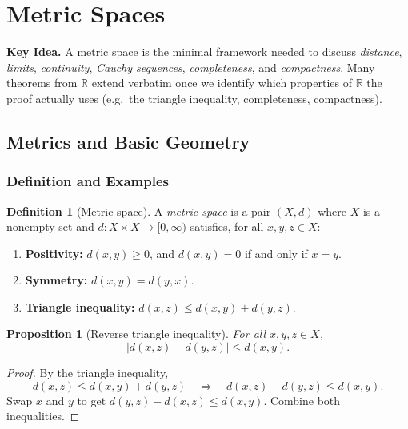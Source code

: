 \documentclass[12pt]{article}
\numberwithin{equation}{section}
\def\abs#1{|#1|}
\newcommand{\RR}{\mathbb{R}}
\DeclarePairedDelimiter{\abs}{\lvert}{\rvert}
\theoremstyle{plain}
\newtheorem{proposition}[theorem]{Proposition}
\theoremstyle{definition}
\newtheorem{definition}[theorem]{Definition}
\theoremstyle{remark}
\newenvironment{keyidea}{\begin{tcolorbox}\textbf{Key Idea.}}{\end{tcolorbox}}
\begin{document}
\newpage


\section{Metric Spaces}

\begin{keyidea}
A metric space is the minimal framework needed to discuss \emph{distance}, \emph{limits},
\emph{continuity}, \emph{Cauchy sequences}, \emph{completeness}, and \emph{compactness}.
Many theorems from $\RR$ extend verbatim once we identify which properties of $\RR$ the proof actually uses
(e.g.\ the triangle inequality, completeness, compactness).
\end{keyidea}

\subsection{Metrics and Basic Geometry}

\subsubsection{Definition and Examples}

\begin{definition}[Metric space]\label{ms:def:metric-space}
A \emph{metric space} is a pair $(X,d)$ where $X$ is a nonempty set and
$d:X\times X\to[0,\infty)$ satisfies, for all $x,y,z\in X$:
\begin{enumerate}[label=(\alph*)]
\item \textbf{Positivity:} $d(x,y)\ge 0$, and $d(x,y)=0$ if and only if $x=y$.
\item \textbf{Symmetry:} $d(x,y)=d(y,x)$.
\item \textbf{Triangle inequality:} $d(x,z)\le d(x,y)+d(y,z)$.
\end{enumerate}
\end{definition}

\begin{proposition}[Reverse triangle inequality]\label{ms:prop:reverse-triangle}
For all $x,y,z\in X$,
\[
\abs{d(x,z)-d(y,z)}\le d(x,y).
\]
\end{proposition}

\begin{proof}
By the triangle inequality,
\[
d(x,z)\le d(x,y)+d(y,z)\quad\Rightarrow\quad d(x,z)-d(y,z)\le d(x,y).
\]
Swap $x$ and $y$ to get $d(y,z)-d(x,z)\le d(x,y)$.
Combine both inequalities.
\end{proof}
\end{document}
